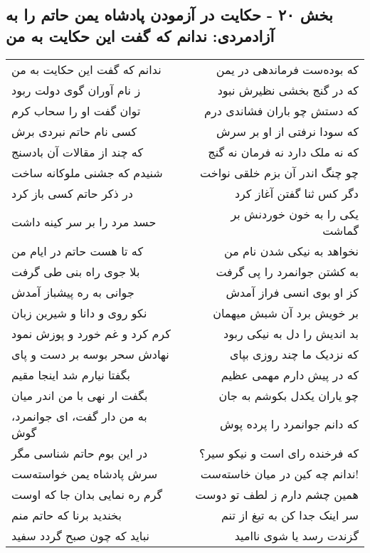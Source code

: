 \begin{center}
\section*{بخش ۲۰ - حکایت در آزمودن پادشاه یمن حاتم را به آزادمردی: ندانم که گفت این حکایت به من}
\label{sec:020}
\begin{longtable}{l p{0.5cm} r}
ندانم که گفت این حکایت به من
&&
که بوده‌ست فرماندهی در یمن
\\
ز نام آوران گوی دولت ربود
&&
که در گنج بخشی نظیرش نبود
\\
توان گفت او را سحاب کرم
&&
که دستش چو باران فشاندی درم
\\
کسی نام حاتم نبردی برش
&&
که سودا نرفتی از او بر سرش
\\
که چند از مقالات آن بادسنج
&&
که نه ملک دارد نه فرمان نه گنج
\\
شنیدم که جشنی ملوکانه ساخت
&&
چو چنگ اندر آن بزم خلقی نواخت
\\
در ذکر حاتم کسی باز کرد
&&
دگر کس ثنا گفتن آغاز کرد
\\
حسد مرد را بر سر کینه داشت
&&
یکی را به خون خوردنش بر گماشت
\\
که تا هست حاتم در ایام من
&&
نخواهد به نیکی شدن نام من
\\
بلا جوی راه بنی طی گرفت
&&
به کشتن جوانمرد را پی گرفت
\\
جوانی به ره پیشباز آمدش
&&
کز او بوی انسی فراز آمدش
\\
نکو روی و دانا و شیرین زبان
&&
بر خویش برد آن شبش میهمان
\\
کرم کرد و غم خورد و پوزش نمود
&&
بد اندیش را دل به نیکی ربود
\\
نهادش سحر بوسه بر دست و پای
&&
که نزدیک ما چند روزی بپای
\\
بگفتا نیارم شد اینجا مقیم
&&
که در پیش دارم مهمی عظیم
\\
بگفت ار نهی با من اندر میان
&&
چو یاران یکدل بکوشم به جان
\\
به من دار گفت، ای جوانمرد، گوش
&&
که دانم جوانمرد را پرده پوش
\\
در این بوم حاتم شناسی مگر
&&
که فرخنده رای است و نیکو سیر؟
\\
سرش پادشاه یمن خواسته‌ست
&&
ندانم چه کین در میان خاسته‌ست!
\\
گرم ره نمایی بدان جا که اوست
&&
همین چشم دارم ز لطف تو دوست
\\
بخندید برنا که حاتم منم
&&
سر اینک جدا کن به تیغ از تنم
\\
نباید که چون صبح گردد سفید
&&
گزندت رسد یا شوی ناامید

\end{longtable}
\end{center}
